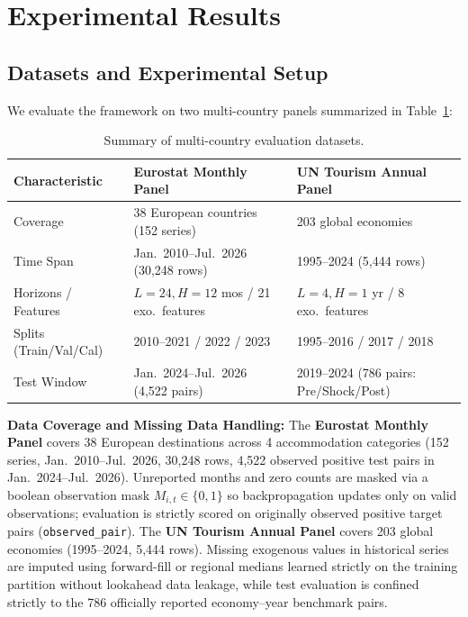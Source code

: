 \documentclass[sigconf]{acmart}
\begin{document}
\section{Experimental Results}
\label{sec:results}

\subsection{Datasets and Experimental Setup}
\label{sec:experimental_setup}
\enlargethispage{20pt}
We evaluate the framework on two multi-country panels summarized in Table~\ref{tab:datasets}:

\begin{table}[b]
\centering
\caption{Summary of multi-country evaluation datasets.}
\label{tab:datasets}
\scriptsize
\setlength{\tabcolsep}{2.5pt}
\renewcommand{\arraystretch}{1.01}
\begin{tabular}{@{}lll@{}}
\toprule
\textbf{Characteristic} & \textbf{Eurostat Monthly Panel} & \textbf{UN Tourism Annual Panel} \\
\midrule
Coverage & 38 European countries (152 series) & 203 global economies \\
Time Span & Jan.\ 2010--Jul.\ 2026 (30,248 rows) & 1995--2024 (5,444 rows) \\
Horizons / Features & $L=24, H=12$ mos / 21 exo.\ features & $L=4, H=1$ yr / 8 exo.\ features \\
Splits (Train/Val/Cal) & 2010--2021 / 2022 / 2023 & 1995--2016 / 2017 / 2018 \\
Test Window & Jan.\ 2024--Jul.\ 2026 (4,522 pairs) & 2019--2024 (786 pairs: Pre/Shock/Post) \\
\bottomrule
\end{tabular}
\end{table}

\textbf{Data Coverage and Missing Data Handling:} The \textbf{Eurostat Monthly Panel} \cite{eurostat_tourism_release} covers 38 European destinations across 4 accommodation categories (152 series, Jan.\ 2010--Jul.\ 2026, 30,248 rows, 4,522 observed positive test pairs in Jan.\ 2024--Jul.\ 2026). Unreported months and zero counts are masked via a boolean observation mask $M_{i,t} \in \{0, 1\}$ so backpropagation updates only on valid observations; evaluation is strictly scored on originally observed positive target pairs (\texttt{observed\_pair}). The \textbf{UN Tourism Annual Panel} \cite{un_tourism_database} covers 203 global economies (1995--2024, 5,444 rows). Missing exogenous values in historical series are imputed using forward-fill or regional medians learned strictly on the training partition without lookahead data leakage, while test evaluation is confined strictly to the 786 officially reported economy--year benchmark pairs.
\end{document}
